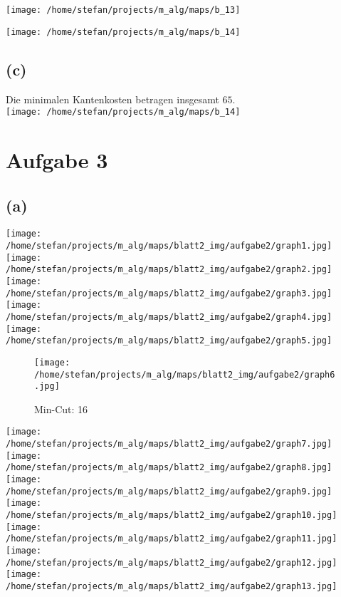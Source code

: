 \documentclass[a4paper]{scrartcl}
\begin{document}
	\texttt{[image: /home/stefan/projects/m\_alg/maps/b\_13]}
	
	\texttt{[image: /home/stefan/projects/m\_alg/maps/b\_14]}
	
	\subsection*{(c)}
	Die minimalen Kantenkosten betragen insgesamt $65$.\\
	
	\texttt{[image: /home/stefan/projects/m\_alg/maps/b\_14]}
	












\section*{Aufgabe 3}
\subsection*{(a)}
\texttt{[image: /home/stefan/projects/m\_alg/maps/blatt2\_img/aufgabe2/graph1.jpg]}
\texttt{[image: /home/stefan/projects/m\_alg/maps/blatt2\_img/aufgabe2/graph2.jpg]}
\texttt{[image: /home/stefan/projects/m\_alg/maps/blatt2\_img/aufgabe2/graph3.jpg]}
\texttt{[image: /home/stefan/projects/m\_alg/maps/blatt2\_img/aufgabe2/graph4.jpg]}
	\texttt{[image: /home/stefan/projects/m\_alg/maps/blatt2\_img/aufgabe2/graph5.jpg]}
\begin{figure}[ht]
	\texttt{[image: /home/stefan/projects/m\_alg/maps/blatt2\_img/aufgabe2/graph6.jpg]}
	\caption{Min-Cut: 16}
\end{figure}
\texttt{[image: /home/stefan/projects/m\_alg/maps/blatt2\_img/aufgabe2/graph7.jpg]}
\texttt{[image: /home/stefan/projects/m\_alg/maps/blatt2\_img/aufgabe2/graph8.jpg]}
\texttt{[image: /home/stefan/projects/m\_alg/maps/blatt2\_img/aufgabe2/graph9.jpg]}
\texttt{[image: /home/stefan/projects/m\_alg/maps/blatt2\_img/aufgabe2/graph10.jpg]}
\texttt{[image: /home/stefan/projects/m\_alg/maps/blatt2\_img/aufgabe2/graph11.jpg]}
\texttt{[image: /home/stefan/projects/m\_alg/maps/blatt2\_img/aufgabe2/graph12.jpg]}
\texttt{[image: /home/stefan/projects/m\_alg/maps/blatt2\_img/aufgabe2/graph13.jpg]}
\end{document}
